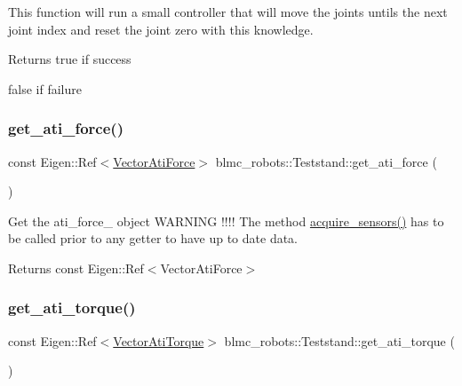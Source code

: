 This function will run a small controller that will move the joints untils the next joint index and reset the joint zero with this knowledge. 

\begin{DoxyReturn}{Returns}
true if success 

false if failure 
\end{DoxyReturn}
\mbox{\label{classblmc__robots_1_1Teststand_af4bf3a4692fdeacdad78a7213c3fbe98}} 
\subsubsection{\texorpdfstring{get\+\_\+ati\+\_\+force()}{get\_ati\_force()}}
{\footnotesize\ttfamily const Eigen\+::\+Ref$<$\hyperlink{classblmc__robots_1_1Teststand_a51f17cf2b01dd8252e21db97b486e067}{Vector\+Ati\+Force}$>$ blmc\+\_\+robots\+::\+Teststand\+::get\+\_\+ati\+\_\+force (\begin{DoxyParamCaption}{ }\end{DoxyParamCaption})\hspace{0.3cm}{\ttfamily [inline]}}



Get the ati\+\_\+force\+\_\+ object W\+A\+R\+N\+I\+NG !!!! The method \hyperlink{classblmc__robots_1_1Teststand_a4203e25148ab5b4ddfef3b46647213c6}{acquire\+\_\+sensors()} has to be called prior to any getter to have up to date data. 

\begin{DoxyReturn}{Returns}
const Eigen\+::\+Ref$<$\+Vector\+Ati\+Force$>$ 
\end{DoxyReturn}
\mbox{\label{classblmc__robots_1_1Teststand_a27ba45a099b4ff6852f5acd0226aa915}} 
\subsubsection{\texorpdfstring{get\+\_\+ati\+\_\+torque()}{get\_ati\_torque()}}
{\footnotesize\ttfamily const Eigen\+::\+Ref$<$\hyperlink{classblmc__robots_1_1Teststand_a466977786f9b007854fa2eb2a97b0de9}{Vector\+Ati\+Torque}$>$ blmc\+\_\+robots\+::\+Teststand\+::get\+\_\+ati\+\_\+torque (\begin{DoxyParamCaption}{ }\end{DoxyParamCaption})\hspace{0.3cm}{\ttfamily [inline]}}



